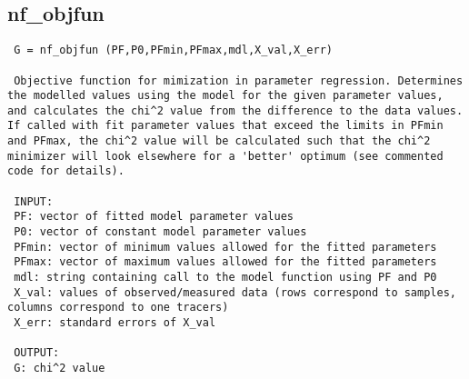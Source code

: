 \subsection{nf\_objfun}\label{sec:ref-nf_objfun}
\begin{lstlisting}
 G = nf_objfun (PF,P0,PFmin,PFmax,mdl,X_val,X_err)

 Objective function for mimization in parameter regression. Determines the modelled values using the model for the given parameter values, and calculates the chi^2 value from the difference to the data values. If called with fit parameter values that exceed the limits in PFmin and PFmax, the chi^2 value will be calculated such that the chi^2 minimizer will look elsewhere for a 'better' optimum (see commented code for details).

 INPUT:
 PF: vector of fitted model parameter values
 P0: vector of constant model parameter values
 PFmin: vector of minimum values allowed for the fitted parameters
 PFmax: vector of maximum values allowed for the fitted parameters
 mdl: string containing call to the model function using PF and P0
 X_val: values of observed/measured data (rows correspond to samples, columns correspond to one tracers)
 X_err: standard errors of X_val

 OUTPUT:
 G: chi^2 value

 
\end{lstlisting}

